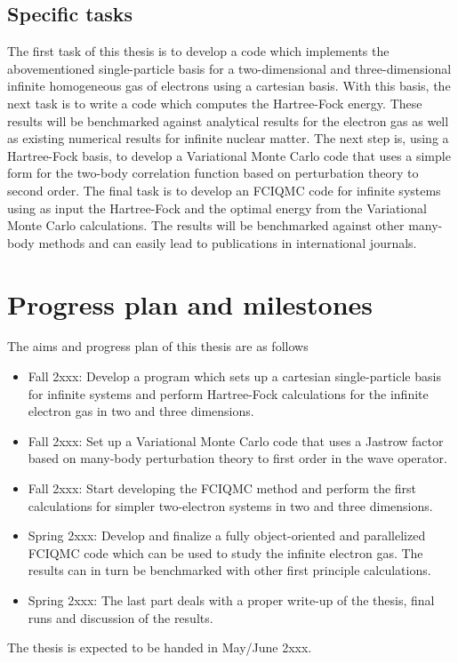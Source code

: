 \documentclass[%
oneside,                 %
final,                   %
10pt]{article}
\begin{document}
\subsection{Specific tasks}

The first task of this thesis is to develop a code which implements the abovementioned single-particle basis for a two-dimensional and three-dimensional infinite homogeneous gas of electrons  using a cartesian basis. With this basis, the next task is to write a code which computes the Hartree-Fock energy. These results will be benchmarked against analytical results for the electron gas as well as existing numerical results for infinite nuclear matter. 
The next step is, using a Hartree-Fock basis, to develop a Variational Monte Carlo code that uses a simple form for the two-body correlation function based on perturbation theory to second order. 
The final task is to develop an FCIQMC code for infinite systems using as input the Hartree-Fock and the optimal energy from the Variational Monte Carlo calculations. The results will be benchmarked against other many-body methods and can easily lead to publications in international journals. 





\section{Progress plan and milestones}

The aims and progress plan of this thesis are as follows

\begin{itemize}
  \item Fall 2xxx: Develop a program which sets up a cartesian single-particle basis for infinite systems and perform Hartree-Fock calculations for the infinite electron gas in two and three dimensions.

  \item Fall 2xxx:  Set up a Variational Monte Carlo code that uses a Jastrow factor based on many-body perturbation theory to first order in the wave operator.

  \item Fall 2xxx:  Start developing the FCIQMC method and perform the first calculations for simpler two-electron systems in two and three dimensions.

  \item Spring 2xxx: Develop and finalize a fully object-oriented and parallelized FCIQMC code which can be used to study the infinite electron gas. The results can in turn be benchmarked with other first principle calculations.

  \item Spring 2xxx: The last part deals with a proper write-up of the thesis, final runs and discussion of the results.
\end{itemize}

\noindent
The thesis is expected to be handed in May/June 2xxx.














\end{document}
